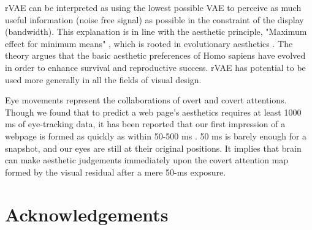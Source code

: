 rVAE can be interpreted as using the lowest possible VAE to perceive as much useful information (noise free signal) as possible in the constraint of the display (bandwidth).  This explanation is in line with the aesthetic principle, "Maximum effect for minimum means" \citep{Hekkert2006}, which is rooted in evolutionary aesthetics \citep{Shimamura2012}. The theory argues that the basic aesthetic preferences of Homo sapiens have evolved in order to enhance survival and reproductive success. rVAE has potential to be used more generally in all the fields of visual design.

Eye movements represent the collaborations of overt and covert attentions. Though we found that to predict a web page's aesthetics requires at least 1000 ms of eye-tracking data, it has been reported that our first impression of a webpage is formed as quickly as within 50-500 ms \citep{Lindgaard2006}. 50 ms is barely enough for a snapshot, and our eyes are still at their original positions. It implies that brain can make aesthetic judgements immediately upon the covert attention map formed by the visual residual after a mere 50-ms exposure.

\section{Acknowledgements}
